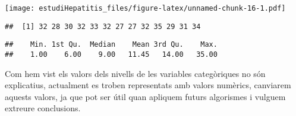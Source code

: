 \documentclass[]{article}
\newenvironment{Shaded}{\begin{snugshade}}{\end{snugshade}}
\newcommand{\DecValTok}[1]{\textcolor[rgb]{0.00,0.00,0.81}{#1}}
\newcommand{\KeywordTok}[1]{\textcolor[rgb]{0.13,0.29,0.53}{\textbf{#1}}}
\newcommand{\NormalTok}[1]{#1}
\newcommand{\OperatorTok}[1]{\textcolor[rgb]{0.81,0.36,0.00}{\textbf{#1}}}
\newcommand{\StringTok}[1]{\textcolor[rgb]{0.31,0.60,0.02}{#1}}
\begin{document}
\begin{Shaded}
\end{Shaded}

\texttt{[image: estudiHepatitis\_files/figure-latex/unnamed-chunk-16-1.pdf]}

\begin{Shaded}
\end{Shaded}

\begin{verbatim}
##  [1] 32 28 30 32 33 32 27 27 32 35 29 31 34
\end{verbatim}

\begin{Shaded}
\end{Shaded}

\begin{verbatim}
##    Min. 1st Qu.  Median    Mean 3rd Qu.    Max. 
##    1.00    6.00    9.00   11.45   14.00   35.00
\end{verbatim}

Com hem vist els valors dels nivells de les variables categòriques no
són explicatius, actualment es troben representats amb valors numèrics,
canviarem aquests valors, ja que pot ser útil quan apliquem futurs
algorismes i vulguem extreure conclusions.

\begin{Shaded}
\end{Shaded}
\end{document}
